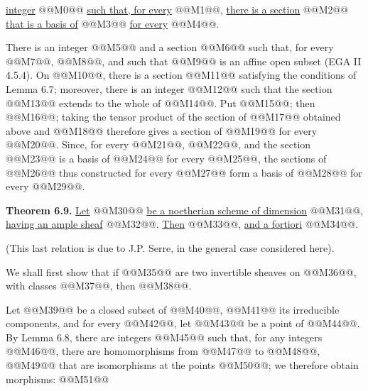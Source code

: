 \uline{integer} @@M0@@ \uline{such that, for every} @@M1@@, \uline{there is a section} @@M2@@ \uline{that is a basis of} @@M3@@ \uline{for every} @@M4@@.

There is an integer @@M5@@ and a section @@M6@@ such that, for every @@M7@@, @@M8@@, and such that @@M9@@ is an affine open subset (EGA II 4.5.4). On @@M10@@, there is a section @@M11@@ satisfying the conditions of Lemma 6.7; moreover, there is an integer @@M12@@ such that the section @@M13@@ extends to the whole of @@M14@@. Put @@M15@@; then @@M16@@; taking the tensor product of the section of @@M17@@ obtained above and @@M18@@ therefore gives a section of @@M19@@ for every @@M20@@. Since, for every @@M21@@, @@M22@@, and the section @@M23@@ is a basis of @@M24@@ for every @@M25@@, the sections of @@M26@@ thus constructed for every @@M27@@ form a basis of @@M28@@ for every @@M29@@.

\textbf{Theorem 6.9.} \uline{Let} @@M30@@ \uline{be a noetherian scheme of dimension} @@M31@@, \uline{having an ample sheaf} @@M32@@. \uline{Then} @@M33@@, \uline{and a fortiori} @@M34@@.

(This last relation is due to J.P. Serre, in the general case considered here).

We shall first show that if @@M35@@ are two invertible sheaves on @@M36@@, with classes @@M37@@, then @@M38@@.

Let @@M39@@ be a closed subset of @@M40@@, @@M41@@ its irreducible components, and for every @@M42@@, let @@M43@@ be a point of @@M44@@. By Lemma 6.8, there are integers @@M45@@ such that, for any integers @@M46@@, there are homomorphisms from @@M47@@ to @@M48@@, @@M49@@ that are isomorphisms at the points @@M50@@; we therefore obtain morphisms:
@@M51@@
